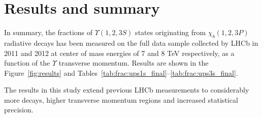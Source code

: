 \section{Results and summary}
\label{sec:results}

In summary, the fractions of $\Upsilon(1,2,3S)$ states originating from $\chi_b(1,2,3P)$ 
radiative decays has been measured on the full data sample collected by LHCb in 2011 and 2012 
at center of mass energies of 7 and 8 TeV respectively, as a function of the $\Upsilon$ 
transverse momentum. Results are shown in the Figure~\ref{fig:results} and 
Tables~\ref{tab:frac:ups1s_final}--\ref{tab:frac:ups3s_final}. 





The results in this study extend previous LHCb measurements to considerably
more decays, higher transverse momentum regions and increased statistical
precision.
